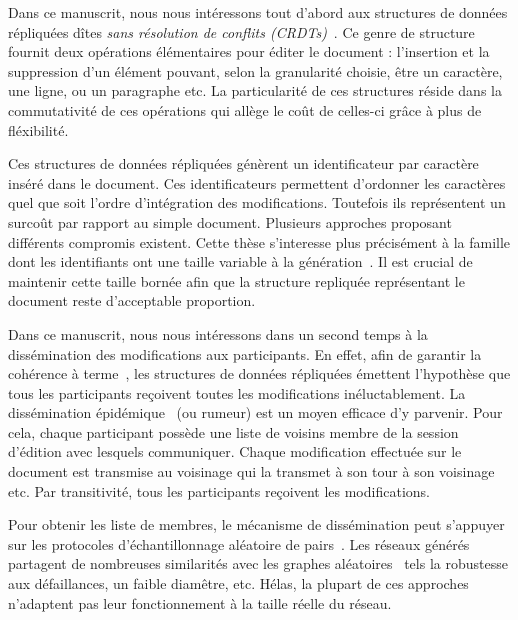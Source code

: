 Dans ce manuscrit, nous nous intéressons tout d'abord aux structures de données
répliquées dîtes \emph{sans résolution de conflits
(CRDTs)}~\cite{shapiro2011comprehensive, shapiro2011conflict}. Ce genre de
structure~\cite{ahmed2011evaluating, andre2013supporting, conway2014language,
grishchenko2010deep, oster2006data, preguica2009commutative, roh2011replicated,
weiss2007wooki, weiss2009logoot, wu2010partial, yu2012stringwise} fournit deux
opérations élémentaires pour éditer le document : l'insertion et la suppression
d'un élément pouvant, selon la granularité choisie, être un caractère, une
ligne, ou un paragraphe etc. La particularité de ces structures réside dans la
commutativité de ces opérations qui allège le coût de celles-ci grâce à plus de
fléxibilité.

Ces structures de données répliquées génèrent un identificateur par caractère
inséré dans le document. Ces identificateurs permettent d'ordonner les
caractères quel que soit l'ordre d'intégration des modifications. Toutefois ils
représentent un surcoût par rapport au simple document. Plusieurs approches
proposant différents compromis existent. Cette thèse s'interesse plus
précisément à la famille dont les identifiants ont une taille variable à la
génération~\cite{andre2013supporting, preguica2009commutative, weiss2009logoot}.
Il est crucial de maintenir cette taille bornée afin que la structure repliquée
représentant le document reste d'acceptable proportion.

Dans ce manuscrit, nous nous intéressons dans un second temps à la dissémination
des modifications aux participants. En effet, afin de garantir la cohérence à
terme~\cite{bailis2013eventual}, les structures de données répliquées émettent
l'hypothèse que tous les participants reçoivent toutes les modifications
inéluctablement. La dissémination épidémique~\cite{birman1999bimodal,
demers1987epidemic, eugster2003lightweight} (ou rumeur) est un moyen efficace
d'y parvenir. Pour cela, chaque participant possède une liste de voisins membre
de la session d'édition avec lesquels communiquer. Chaque modification effectuée
sur le document est transmise au voisinage qui la transmet à son tour à son
voisinage etc. Par transitivité, tous les participants reçoivent les
modifications.

Pour obtenir les liste de membres, le mécanisme de dissémination peut s'appuyer
sur les protocoles d'échantillonnage aléatoire de
pairs~\cite{eugster2003lightweight, ganesh2001scamp, jelasity2007gossip,
tolgyeski2009adaptive, voulgaris2005cyclon}. Les réseaux générés partagent de
nombreuses similarités avec les graphes aléatoires~\cite{erdos1959random} tels
la robustesse aux défaillances, un faible diamêtre, etc. Hélas, la plupart de
ces approches n'adaptent pas leur fonctionnement à la taille réelle du réseau.


